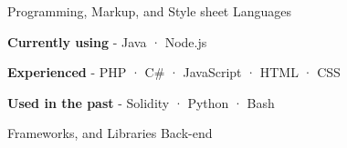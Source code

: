 

\begin{cventries}
  
  \cventry
    {Programming, Markup, and Style sheet} %
    {Languages} %
    {} %
    {} %
    {
      \begin{cvitems} %
        \item {\textbf{Currently using} \hspace{0.03cm} - \hspace{0.03cm} Java \hspace{0.03cm} · \hspace{0.03cm} Node.js} %
        \item {\textbf{Experienced} \hspace{0.03cm} - \hspace{0.03cm} PHP \hspace{0.03cm} · \hspace{0.03cm} C\# \hspace{0.03cm} · \hspace{0.03cm} JavaScript \hspace{0.03cm} · \hspace{0.03cm} HTML \hspace{0.03cm} · \hspace{0.03cm} CSS} %
        \item {\textbf{Used in the past} \hspace{0.03cm} - \hspace{0.03cm} Solidity \hspace{0.03cm} · \hspace{0.03cm} Python \hspace{0.03cm} · \hspace{0.03cm} Bash \\} %
      \end{cvitems}
    }
\cventry
{Frameworks, and Libraries} %
{Back-end} %
{} %
{} %
{
  \begin{cvitems} %

\end{cvitems}}
\end{cventries}
